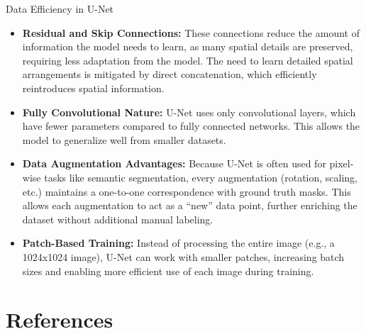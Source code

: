 \documentclass[serif, aspectratio=169]{beamer}
\begin{document}
\begin{frame}{Data Efficiency in U-Net}
\scriptsize
\begin{itemize}
    \item \textbf{Residual and Skip Connections:} These connections reduce the amount of information the model needs to learn, as many spatial details are preserved, requiring less adaptation from the model. The need to learn detailed spatial arrangements is mitigated by direct concatenation, which efficiently reintroduces spatial information.
    \vspace{0.3cm}
    \item \textbf{Fully Convolutional Nature:} U-Net uses only convolutional layers, which have fewer parameters compared to fully connected networks. This allows the model to generalize well from smaller datasets.
    \vspace{0.3cm}
    \item \textbf{Data Augmentation Advantages:} Because U-Net is often used for pixel-wise tasks like semantic segmentation, every augmentation (rotation, scaling, etc.) maintains a one-to-one correspondence with ground truth masks. This allows each augmentation to act as a ``new'' data point, further enriching the dataset without additional manual labeling.
    \vspace{0.3cm}
    \item \textbf{Patch-Based Training:} Instead of processing the entire image (e.g., a 1024x1024 image), U-Net can work with smaller patches, increasing batch sizes and enabling more efficient use of each image during training.
\end{itemize}
\end{frame}




\section{References}
\end{document}
